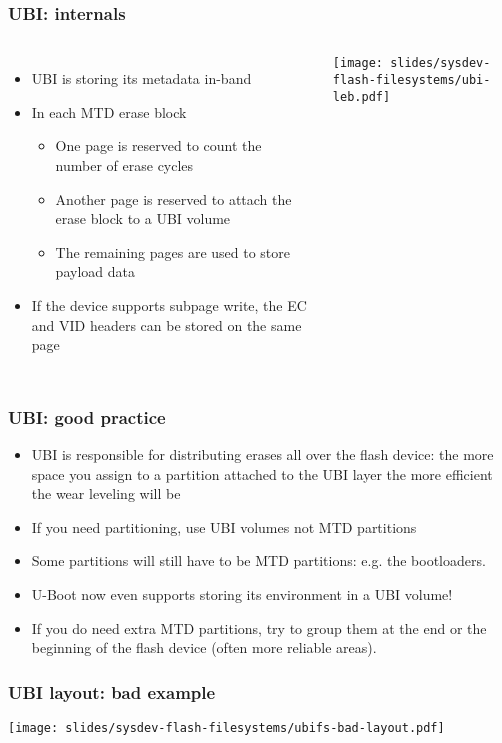 \begin{frame}
  \frametitle{UBI: internals}
  \begin{columns}
    \begin{itemize}
    \item UBI is storing its metadata in-band
    \item In each MTD erase block
    \begin{itemize}
      \item One page is reserved to count the number of erase cycles
      \item Another page is reserved to attach the erase block to a
        UBI volume
      \item The remaining pages are used to store payload data
      \end{itemize}
    \item If the device supports subpage write, the EC and VID headers
      can be stored on the same page
    \end{itemize}
    \texttt{[image: slides/sysdev-flash-filesystems/ubi-leb.pdf]}
  \end{columns}
\end{frame}

\begin{frame}
  \frametitle{UBI: good practice}
  \begin{itemize}
  \item UBI is responsible for distributing erases all over the flash
    device: the more space you assign to a partition attached to the
    UBI layer the more efficient the wear leveling will be
  \item If you need partitioning, use UBI volumes not MTD partitions
  \item Some partitions will still have to be MTD partitions: e.g. the
    bootloaders.
  \item U-Boot now even supports storing its environment in a UBI volume!
  \item If you do need extra MTD partitions, try to group them at the end
    or the beginning of the flash device (often more reliable areas).
  \end{itemize}
\end{frame}

\begin{frame}
  \frametitle{UBI layout: bad example}
  \begin{center}
    \texttt{[image: slides/sysdev-flash-filesystems/ubifs-bad-layout.pdf]}
  \end{center}
\end{frame}

